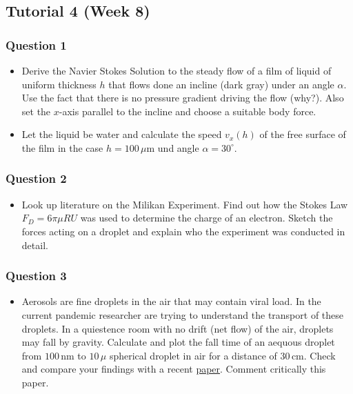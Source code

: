 \documentclass[11pt]{article}
\providecommand{\tightlist}{%
      \setlength{\itemsep}{0pt}\setlength{\parskip}{0pt}}
\begin{document}
\subsection{Tutorial 4 (Week 8)}\label{tutorial-4-week-8-1}

\subsubsection{Question 1}\label{question-1-2}

\begin{itemize}
\item
  Derive the Navier Stokes Solution to the steady flow of a film of
  liquid of uniform thickness \(h\) that flows done an incline (dark
  gray) under an angle \(\alpha\). Use the fact that there is no
  pressure gradient driving the flow (why?). Also set the \(x\)-axis
  parallel to the incline and choose a suitable body force.
\item
  Let the liquid be water and calculate the speed \(v_x(h)\) of the free
  surface of the film in the case \(h=100\,\mu\)m und angle
  \(\alpha=30^\circ\).
\end{itemize}

\subsubsection{Question 2}\label{question-2-2}

\begin{itemize}
\tightlist
\item
  Look up literature on the Milikan Experiment. Find out how the Stokes
  Law \(F_D=6\pi\mu R U\) was used to determine the charge of an
  electron. Sketch the forces acting on a droplet and explain who the
  experiment was conducted in detail.
\end{itemize}

\subsubsection{Question 3}\label{question-3}

\begin{itemize}
\tightlist
\item
  Aerosols are fine droplets in the air that may contain viral load. In
  the current pandemic researcher are trying to understand the transport
  of these droplets. In a quiestence room with no drift (net flow) of
  the air, droplets may fall by gravity. Calculate and plot the fall
  time of an aequous droplet from \(100\,\)nm to \(10\,\mu\) spherical
  droplet in air for a distance of \(30\,\)cm. Check and compare your
  findings with a recent
  \href{https://www.pnas.org/content/early/2020/05/12/2006874117}{paper}.
  Comment critically this paper.
\end{itemize}
\end{document}

